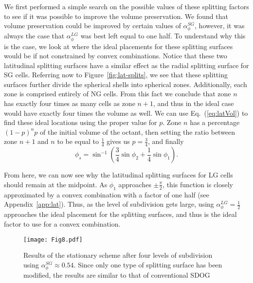 We first performed a simple search on the possible values of these splitting factors to see if it was possible to improve the volume preservation.
We found that volume preservation could be improved by certain values of $\alpha_{\phi}^{SG}$, however, it was always the case that $\alpha_{\phi}^{LG}$ was best left equal to one half.
To understand why this is the case, we look at where the ideal placements for these splitting surfaces would be if not constrained by convex combinations.
Notice that these two latitudinal splitting surfaces have a similar effect as the radial splitting surface for SG cells.
Referring now to Figure~\ref{fig:lat-splits}, we see that these splitting surfaces further divide the spherical shells into spherical zones.
Additionally, each zone is comprised entirely of NG cells.
From this fact we conclude that zone $n$ has exactly four times as many cells as zone $n+1$, and thus in the ideal case would have exactly four times the volume as well.
We can use Eq.~(\ref{eq:latVol}) to find these ideal locations using the proper value for $p$.
Zone $n$ has a percentage $\left( 1 - p \right)^{n} p$ of the initial volume of the octant, then setting the ratio between zone $n+1$ and $n$ to be equal to $\frac{1}{4}$ gives us $p = \frac{3}{4}$, and finally
%
\begin{equation} \label{eq:idealLat}
\phi_{s} = \sin^{-1} \left( \frac{3}{4} \sin\phi_{2} + \frac{1}{4} \sin\phi_{1} \right).
\end{equation}


From here, we can now see why the latitudinal splitting surfaces for LG cells should remain at the midpoint.
As $\phi_{1}$ approaches $\pm \frac{\pi}{2}$, this function is closely approximated by a convex combination with a factor of one half (see Appendix~\ref{app:lat}).
Thus, as the level of subdivision gets large, using $\alpha_{\phi}^{LG} = \frac{1}{2}$ approaches the ideal placement for the splitting surfaces, and thus is the ideal factor to use for a convex combination.


\begin{figure}[tbp]
	\texttt{[image: Fig8.pdf]}
	\caption{Results of the stationary scheme after four levels of subdivision using $\alpha_{\phi}^{SG} \approx 0.54$.
		Since only one type of splitting surface has been modified, the results are similar to that of conventional SDOG}
	\label{fig:stationary}
\end{figure}


